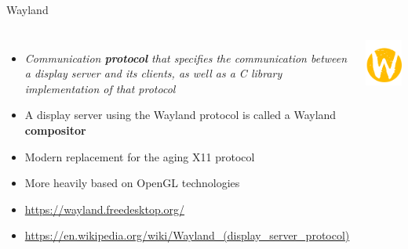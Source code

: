 \begin{frame}{Wayland}
  \begin{columns}[T]
    \begin{itemize}
    \item {\em Communication {\bf protocol} that specifies the
        communication between a display server and its clients, as
        well as a C library implementation of that protocol}
    \item A display server using the Wayland protocol is called a
      Wayland {\bf compositor}
    \item Modern replacement for the aging X11 protocol
    \item More heavily based on OpenGL technologies
    \item \url{https://wayland.freedesktop.org/}
    \item \url{https://en.wikipedia.org/wiki/Wayland_(display_server_protocol)}
    \end{itemize}
    \includegraphics[width=\textwidth]{slides/sysdev-software-stacks/wayland.png}
  \end{columns}
\end{frame}

